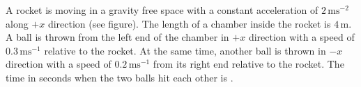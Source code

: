 

    \item A rocket is moving in a gravity free space with a constant acceleration of \(2 \, \text{ms}^{-2}\) along \(+x\) direction (see figure). The length of a chamber inside the rocket is \(4 \, \text{m}\). A ball is thrown from the left end of the chamber in \(+x\) direction with a speed of \(0.3 \, \text{ms}^{-1}\) relative to the rocket. At the same time, another ball is thrown in \(-x\) direction with a speed of \(0.2 \, \text{ms}^{-1}\) from its right end relative to the rocket. The time in seconds when the two balls hit each other is \underline{\hspace{2.5 cm}}.

    \begin{center}
    \end{center}

